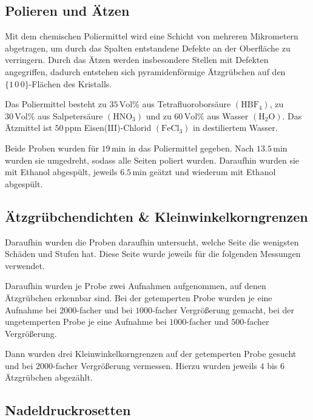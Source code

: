 \documentclass[12pt,a4paper]{scrartcl}
\numberwithin{equation}{section} %
\renewcommand{\[}{} %
\renewcommand{\]}{\noindent} %
\begin{document}
\hypertarget{polieren-und-uxe4tzen}{%
\subsection{Polieren und Ätzen}\label{polieren-und-uxe4tzen}}

Mit dem chemischen Poliermittel wird eine Schicht von mehreren
Mikrometern abgetragen, um durch das Spalten entstandene Defekte an der
Oberfläche zu verringern. Durch das Ätzen werden insbesondere Stellen
mit Defekten angegriffen, dadurch entstehen sich pyramidenförmige
Ätzgrübchen auf den \(\{1\,0\,0\}\)-Flächen des Kristalls.

Das Poliermittel besteht zu \(35\,\mathrm{Vol\%}\) aus
Tetrafluoroborsäure \((\mathrm{HBF_4})\), zu \(30\,\mathrm{Vol\%}\) aus
Salpetersäure \((\mathrm{HNO_3})\) und zu \(60\,\mathrm{Vol\%}\) aus
Wasser \((\mathrm{H_2O})\). Das Ätzmittel ist \(50\,\mathrm{ppm}\)
Eisen(III)-Chlorid \((\mathrm{FeCl_3})\) in destiliertem Wasser.

Beide Proben wurden für \(19\mathrm{\,min}\) in das Poliermittel
gegeben. Nach \(13.5\mathrm{\,min}\) wurden sie umgedreht, sodass alle
Seiten poliert wurden. Daraufhin wurden sie mit Ethanol abgespült,
jeweils \(6.5\mathrm{\,min}\) geätzt und wiederum mit Ethanol abgespült.

\hypertarget{uxe4tzgruxfcbchendichten-kleinwinkelkorngrenzen}{%
\subsection{Ätzgrübchendichten \&
Kleinwinkelkorngrenzen}\label{uxe4tzgruxfcbchendichten-kleinwinkelkorngrenzen}}

Daraufhin wurden die Proben daraufhin untersucht, welche Seite die
wenigsten Schäden und Stufen hat. Diese Seite wurde jeweils für die
folgenden Messungen verwendet.

Daraufhin wurden je Probe zwei Aufnahmen aufgenommen, auf denen
Ätzgrübchen erkennbar sind. Bei der getemperten Probe wurden je eine
Aufnahme bei \(2000\)-facher und bei \(1000\)-facher Vergrößerung
gemacht, bei der ungetemperten Probe je eine Aufnahme bei
\(1000\)-facher und \(500\)-facher Vergrößerung.

Dann wurden drei Kleinwinkelkorngrenzen auf der getemperten Probe
gesucht und bei \(2000\)-facher Vergrößerung vermessen. Hierzu wurden
jeweils \(4\) bis \(6\) Ätzgrübchen abgezählt.

\hypertarget{nadeldruckrosetten}{%
\subsection{Nadeldruckrosetten}\label{nadeldruckrosetten}}
\end{document}
